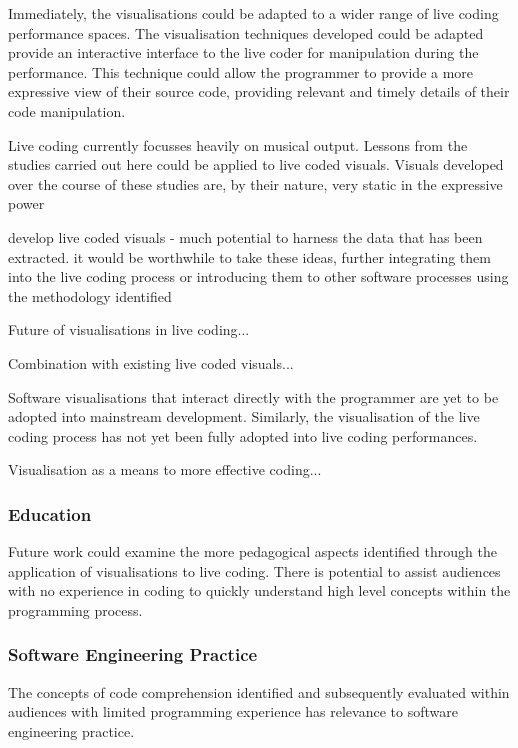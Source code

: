 Immediately, the visualisations could be adapted to a wider range of live coding performance spaces. The visualisation techniques developed could be adapted provide an interactive interface to the live coder for manipulation during the performance. This technique could allow the programmer to provide a more expressive view of their source code, providing relevant and timely details of their code manipulation. 

Live coding currently focusses heavily on musical output. Lessons from the studies carried out here could be applied to live coded visuals. Visuals developed over the course of these studies are, by their nature, very static in the expressive power 

develop live coded visuals - much potential to harness the data that has been extracted. it would be worthwhile to take these ideas, further integrating them into the live coding process or introducing them to other software processes using the methodology identified

Future of visualisations in live coding...

Combination with existing live coded visuals...

Software visualisations that interact directly with the programmer are yet to be adopted into mainstream development. Similarly, the visualisation of the live coding process has not yet been fully adopted into live coding performances.

Visualisation as a means to more effective coding...


\subsubsection{Education}

Future work could examine the more pedagogical aspects identified through the application of visualisations to live coding. There is potential to assist audiences with no experience in coding to quickly understand high level concepts within the programming process. \more

\subsubsection{Software Engineering Practice}

The concepts of code comprehension identified and subsequently evaluated within audiences with limited programming experience has relevance to software engineering practice. \more

